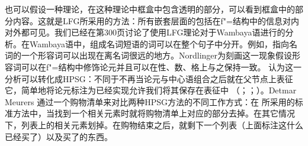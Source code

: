 也\label{page-Bender-Wambaya-two}可以假设一种理论，在这种理论中框盒中包含透明的部分，可以看到框盒中的部分内容。这就是LFG\indexlfgc 所采用的方法：所有嵌套层面的包括在f"=结构中的信息对内对外都可见。我们已经在第300页讨论了\citeyearpar{Nordlinger98a-u}使用LFG理论对于Wambaya语进行的分析。在Wambaya语中，组成名词短语的词可以在整个句子中分开。例如，指向名词的一个形容词可以出现在离名词很远的地方。Nordlinger为刻画这一现象假设形容词可以在f"=结构中修饰论元并且可以在性、数、格上与之保持一致。 \citet{Bender2008a}认为这一分析可以转化成HPSG\indexhpsgc：不同于不再当论元与中心语组合之后就在父节点上表征它，简单地将论元标注为已经实现允许我们将其保存在表征中 （\citealp{Meurers99b}；\citealp{Prze99}；\citealp[\S~17.4]{MuellerLehrbuch1}）。Detmar Meurers 通过一个购物清单来对比两种HPSG方法的不同工作方式：在 \citet{ps2}所采用的标准方法中，当找到一个相关元素时就将购物清单上对应的部分去掉。在其它情况下，列表上的相关元素划掉。在购物结束之后，就剩下一个列表（上面标注这什么已经买了）以及买了的东西。
  
